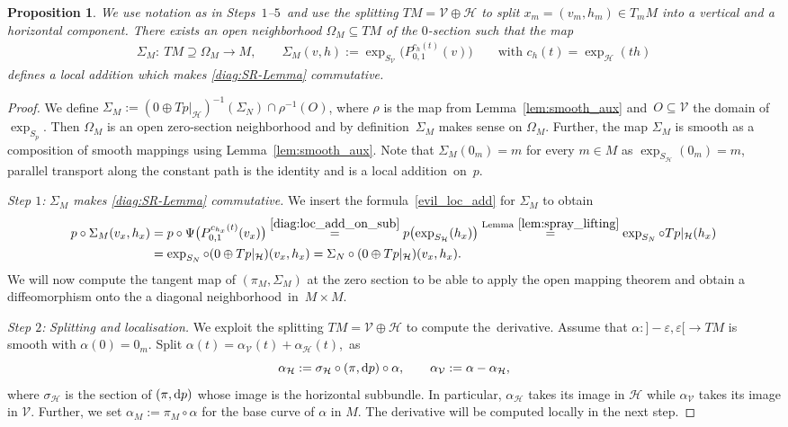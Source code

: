 \documentclass[pdftex]{sigma}
\numberwithin{equation}{section}
\newtheorem{Proposition}[Theorem]{Proposition}
\newcommand{\cH}{\ensuremath{\mathcal{H}}}
\newcommand{\cV}{\ensuremath{\mathcal{V}}}
\begin{document}
\begin{Proposition}\label{prop:custom_sigma}
We use notation as in %
Steps~$1$--$5$~and use the splitting $TM=\cV \oplus \cH$ to split $x_m=(v_m,h_m) \in T_m M$ into a vertical and a horizontal component.
There exists an open neighborhood $\Omega_M \subseteq TM$ of the $0$-section such that the map
\begin{align}\label{evil_loc_add}
\Sigma_M\colon \ TM\supseteq \Omega_M \rightarrow M,\qquad \Sigma_{M} (v,h) := \exp_{S_{\cV}}\bigl(P_{0,1}^{c_h(t)}(v)\bigr) \qquad \text{with } c_h(t)=\exp_{\cH}(th)\!\!
\end{align}
defines a local addition which makes \eqref{diag:SR-Lemma} commutative.
\end{Proposition}

\begin{proof}
We define $\Sigma_M := (0 \oplus Tp|_{\cH})^{-1}(\Sigma_N) \cap \rho^{-1} (O)$, where $\rho$ is the map from Lemma~\ref{lem:smooth_aux} and~${O \subseteq \cV}$ the domain of $\exp_{S_p}$. Then $\Omega_M$ is an open zero-section neighborhood and by definition~$\Sigma_M$ makes sense on $\Omega_M$. Further, the map $\Sigma_M$ is smooth as a composition of smooth mappings using Lemma~\ref{lem:smooth_aux}. Note that $\Sigma_M (0_m) = m$ for every $m \in M$ as $\exp_{S_\cH} (0_m)=m$, parallel transport along the constant path is the identity and \smash{$\Psi=\bigl(\pi_{\cV}, \exp_{S_\cV}\bigr)$} is a local addition~on~$p$.

{\it Step $1$:} \emph{$\Sigma_M$ makes \eqref{diag:SR-Lemma} commutative.} We insert the formula~\eqref{evil_loc_add} for $\Sigma_M$ to obtain
\begin{align*}
p\circ \Sigma_M (v_x,h_x)&= p\circ \Psi \bigl(P_{0,1}^{c_{h_x}(t)}(v_x)\bigr) \stackrel{\eqref{diag:loc_add_on_sub}}{=} p \bigl(\exp_{S_\cH} (h_x)\bigr)\stackrel{\text{Lemma}~\ref{lem:spray_lifting}}{=} \exp_{S_N} \circ Tp|_\cH (h_x)\\
& = \exp_{S_N} \circ (0\oplus Tp|_\cH)(v_x,h_x) = \Sigma_N\circ (0\oplus Tp|_\cH)(v_x,h_x).
\end{align*}
We will now compute the tangent map of $(\pi_M,\Sigma_M)$ at the zero section to be able to apply the open mapping theorem and obtain a diffeomorphism onto the a diagonal neighborhood~in~${M\times M}$.

{\it Step $2$:} \emph{Splitting and localisation.}
We exploit the splitting $TM = \cV \oplus \cH$ to compute the~derivative. Assume that $\alpha \colon {}]{-}\varepsilon,\varepsilon[ \rightarrow TM$ is smooth with $\alpha(0)=0_m$. Split $\alpha(t)=\alpha_\cV(t) + \alpha_\cH(t)$,~as
\begin{displaymath}
 \alpha_\cH := \sigma_\cH \circ (\pi,{\rm d}p) \circ \alpha, \qquad \alpha_\cV := \alpha - \alpha_\cH,
\end{displaymath}
where $\sigma_\cH$ is the section of $(\pi,{\rm d}p)$ whose image is the horizontal subbundle. In particular, $\alpha_\cH$ takes its image in $\cH$ while $\alpha_\cV$ takes its image in $\cV$. Further, we set $\alpha_M := \pi_{M} \circ \alpha$ for the base curve of $\alpha$ in $M$. The derivative will be computed locally in the next step.


\end{proof}
\end{document}
